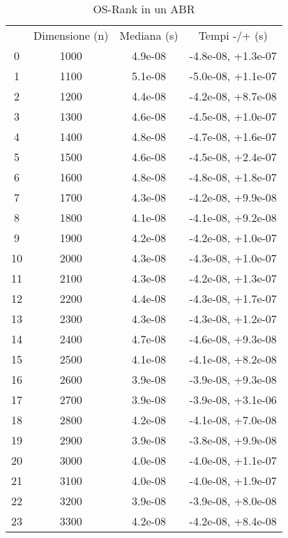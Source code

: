 \begin{table}
\centering
\caption{OS-Rank in un ABR}
\label{OS-Rank in un ABR}
\begin{adjustbox}{width=1\textwidth/2}
\begin{tabular}{|c|c|c|c|}
\hline
 & Dimensione (n) & Mediana (s) & Tempi -/+ (s) \\
0 & 1000 & 4.9e-08 & -4.8e-08, +1.3e-07 \\
\cline{1-4}
1 & 1100 & 5.1e-08 & -5.0e-08, +1.1e-07 \\
\cline{1-4}
2 & 1200 & 4.4e-08 & -4.2e-08, +8.7e-08 \\
\cline{1-4}
3 & 1300 & 4.6e-08 & -4.5e-08, +1.0e-07 \\
\cline{1-4}
4 & 1400 & 4.8e-08 & -4.7e-08, +1.6e-07 \\
\cline{1-4}
5 & 1500 & 4.6e-08 & -4.5e-08, +2.4e-07 \\
\cline{1-4}
6 & 1600 & 4.8e-08 & -4.8e-08, +1.8e-07 \\
\cline{1-4}
7 & 1700 & 4.3e-08 & -4.2e-08, +9.9e-08 \\
\cline{1-4}
8 & 1800 & 4.1e-08 & -4.1e-08, +9.2e-08 \\
\cline{1-4}
9 & 1900 & 4.2e-08 & -4.2e-08, +1.0e-07 \\
\cline{1-4}
10 & 2000 & 4.3e-08 & -4.3e-08, +1.0e-07 \\
\cline{1-4}
11 & 2100 & 4.3e-08 & -4.2e-08, +1.3e-07 \\
\cline{1-4}
12 & 2200 & 4.4e-08 & -4.3e-08, +1.7e-07 \\
\cline{1-4}
13 & 2300 & 4.3e-08 & -4.3e-08, +1.2e-07 \\
\cline{1-4}
14 & 2400 & 4.7e-08 & -4.6e-08, +9.3e-08 \\
\cline{1-4}
15 & 2500 & 4.1e-08 & -4.1e-08, +8.2e-08 \\
\cline{1-4}
16 & 2600 & 3.9e-08 & -3.9e-08, +9.3e-08 \\
\cline{1-4}
17 & 2700 & 3.9e-08 & -3.9e-08, +3.1e-06 \\
\cline{1-4}
18 & 2800 & 4.2e-08 & -4.1e-08, +7.0e-08 \\
\cline{1-4}
19 & 2900 & 3.9e-08 & -3.8e-08, +9.9e-08 \\
\cline{1-4}
20 & 3000 & 4.0e-08 & -4.0e-08, +1.1e-07 \\
\cline{1-4}
21 & 3100 & 4.0e-08 & -4.0e-08, +1.9e-07 \\
\cline{1-4}
22 & 3200 & 3.9e-08 & -3.9e-08, +8.0e-08 \\
\cline{1-4}
23 & 3300 & 4.2e-08 & -4.2e-08, +8.4e-08 \\

\end{tabular}
\end{adjustbox}
\end{table}
